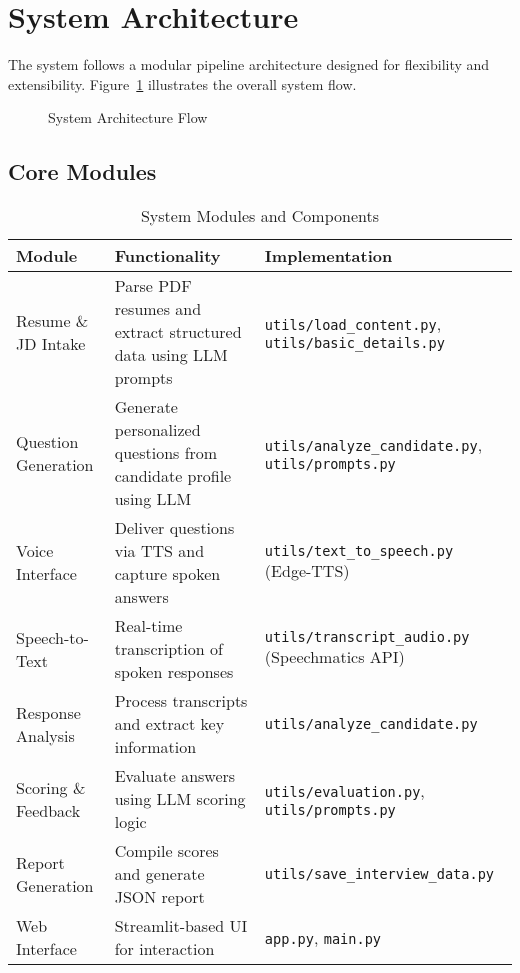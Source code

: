 \documentclass[conference]{IEEEtran}
\begin{document}
\section{System Architecture}

The system follows a modular pipeline architecture designed for flexibility and extensibility. Figure~\ref{fig:architecture} illustrates the overall system flow.

\begin{figure}[htbp]
\centering
{}
\caption{System Architecture Flow}
\label{fig:architecture}
\end{figure}

\subsection{Core Modules}

\begin{table*}[t]
\centering
\caption{System Modules and Components}
\label{tab:modules}
\begin{tabular}{p{3cm}p{5cm}p{5cm}}
\toprule
\textbf{Module} & \textbf{Functionality} & \textbf{Implementation} \\
\midrule
Resume \& JD Intake & Parse PDF resumes and extract structured data using LLM prompts & \texttt{utils/load\_content.py}, \texttt{utils/basic\_details.py} \\
\midrule
Question Generation & Generate personalized questions from candidate profile using LLM & \texttt{utils/analyze\_candidate.py}, \texttt{utils/prompts.py} \\
\midrule
Voice Interface & Deliver questions via TTS and capture spoken answers & \texttt{utils/text\_to\_speech.py} (Edge-TTS) \\
\midrule
Speech-to-Text & Real-time transcription of spoken responses & \texttt{utils/transcript\_audio.py} (Speechmatics API) \\
\midrule
Response Analysis & Process transcripts and extract key information & \texttt{utils/analyze\_candidate.py} \\
\midrule
Scoring \& Feedback & Evaluate answers using LLM scoring logic & \texttt{utils/evaluation.py}, \texttt{utils/prompts.py} \\
\midrule
Report Generation & Compile scores and generate JSON report & \texttt{utils/save\_interview\_data.py} \\
\midrule
Web Interface & Streamlit-based UI for interaction & \texttt{app.py}, \texttt{main.py} \\
\bottomrule
\end{tabular}
\end{table*}
\end{document}
